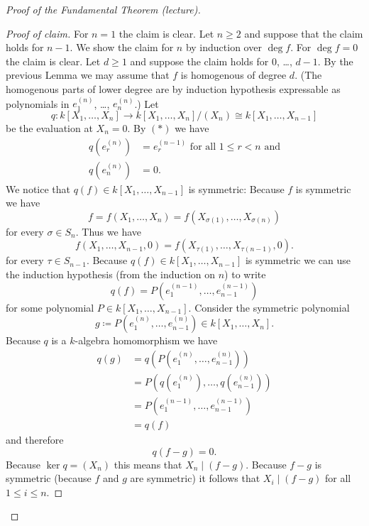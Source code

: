 \begin{proof}[Proof of the Fundamental Theorem (lecture)]
\begin{proof}[Proof of claim]
    For $n = 1$ the claim is clear. Let $n \geq 2$ and suppose that the claim holds for $n-1$.
    We show the claim for $n$ by induction over $\deg f$.
    For $\deg f = 0$ the claim is clear.
    Let $d \geq 1$ and suppose the claim holds for $0$, \dots, $d-1$.
    By the previous Lemma we may assume that $f$ is homogenous of degree $d$.
    (The homogenous parts of lower degree are by induction hypothesis expressable as polynomials in $e^{(n)}_1$, \dots, $e^{(n)}_n$.)
    Let
    \[
              q
      \colon  k[X_1, \dotsc, X_n]
      \to     k[X_1, \dotsc, X_n]/(X_n)
      \cong   k[X_1, \dotsc, X_{n-1}]
    \]
    be the evaluation at $X_n = 0$.
    By $(\ast)$ we have
    \begin{align*}
          q\left( e^{(n)}_r \right)
      &=  e^{(n-1)}_r
      \text{ for all } 1 \leq r < n
      \text{ and}
      \\
          q\left( e^{(n)}_n \right)
      &=  0.
    \end{align*}
    We notice that $q(f) \in k[X_1, \dotsc, X_{n-1}]$ is symmetric:
    Because $f$ is symmetric we have
    \[
        f
      = f(X_1, \dotsc, X_n)
      = f(X_{\sigma(1)}, \dotsc, X_{\sigma(n)})
    \]
    for every $\sigma \in S_n$.
    Thus we have
    \[
        f(X_1, \dotsc, X_{n-1}, 0)
      = f(X_{\tau(1)}, \dotsc, X_{\tau(n-1)}, 0).
    \]
    for every $\tau \in S_{n-1}$.
    Because $q(f) \in k[X_1, \dotsc, X_{n-1}]$ is symmetric we can use the induction hypothesis (from the induction on $n$) to write
    \[
        q(f)
      = P\left( e^{(n-1)}_1, \dotsc, e^{(n-1)}_{n-1} \right)
    \]
    for some polynomial $P \in k[X_1, \dotsc, X_{n-1}]$.
    Consider the symmetric polynomial
    \[
                g
      \coloneqq P\left( e^{(n)}_1, \dotsc, e^{(n)}_{n-1} \right)
      \in       k[X_1, \dotsc, X_n].
    \]
    Because $q$ is a $k$-algebra homomorphism we have
    \begin{align*}
         q(g)
      &= q\left( P\left(e^{(n)}_1, \dotsc, e^{(n)}_{n-1}\right) \right) \\
      &= P\left( q\left(e^{(n)}_1\right), \dotsc, q\left(e^{(n)}_{n-1}\right) \right) \\
      &= P\left( e^{(n-1)}_1, \dotsc, e^{(n-1)}_{n-1} \right) \\
      &= q(f)
    \end{align*}
    and therefore
    \[
        q(f - g)
      = 0.
    \]
    Because $\ker q = (X_n)$ this means that $X_n \mid (f-g)$.
    Because $f-g$ is symmetric (because $f$ and $g$ are symmetric) it follows that $X_i \mid (f-g)$ for all $1 \leq i \leq n$.

\end{proof}
\end{proof}
